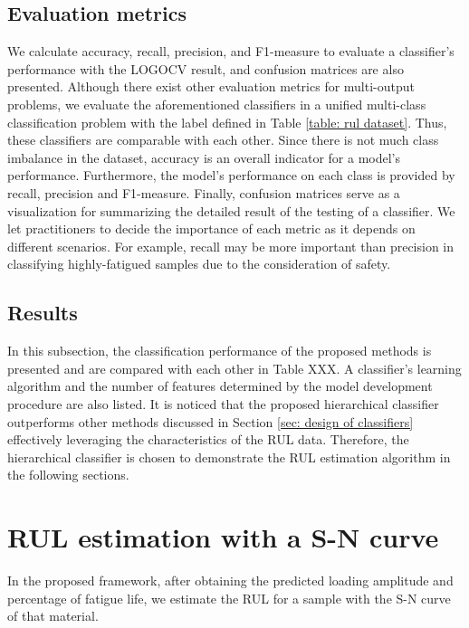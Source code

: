 \subsection{Evaluation metrics}
We calculate accuracy, recall, precision, and F1-measure to evaluate a classifier's performance with the LOGOCV result, and confusion matrices are also presented. Although there exist other evaluation metrics for multi-output problems, we evaluate the aforementioned classifiers in a unified multi-class classification problem with the label defined in Table \ref{table: rul dataset}. Thus, these classifiers are comparable with each other. Since there is not much class imbalance in the dataset, accuracy is an overall indicator for a model's performance. Furthermore, the model's performance on each class is provided by recall, precision and F1-measure. Finally, confusion matrices serve as a visualization for summarizing the detailed result of the testing of a classifier. We let practitioners to decide the importance of each metric as it depends on different scenarios. For example, recall may be more important than precision in classifying highly-fatigued samples due to the consideration of safety.

\subsection{Results}
In this subsection, the classification performance of the proposed methods is presented and are compared with each other in Table XXX. A classifier's learning algorithm and the number of features determined by the model development procedure are also listed. It is noticed that the proposed hierarchical classifier outperforms other methods discussed in Section \ref{sec: design of classifiers} effectively leveraging the characteristics of the RUL data. Therefore, the hierarchical classifier is chosen to demonstrate the RUL estimation algorithm in the following sections.

\section{RUL estimation with a S-N curve}
In the proposed framework, after obtaining the predicted loading amplitude and percentage of fatigue life, we estimate the RUL for a sample with the S-N curve of that material.

